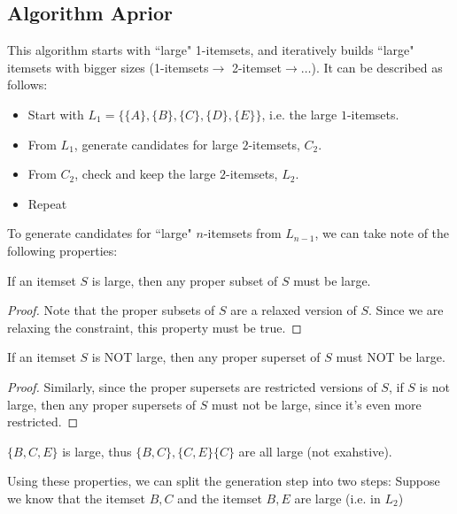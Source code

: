 \documentclass[../main/main.tex]{subfiles}
\begin{document}
	\subsection{Algorithm Aprior}
	This algorithm starts with ``large" 1-itemsets, and iteratively builds ``large" itemsets with bigger sizes (1-itemsets$\to$ 2-itemset$\to\ldots$). It can be described as follows:
	\begin{itemize}
		\item Start with $L_1=\{\{A\} ,\{B\} ,\{C\} ,\{D\} ,\{E\} \} $, i.e. the large $1$-itemsets.
		\item From $L_1$, generate candidates for large $2$-itemsets, $C_2$.
		\item From $C_2$, check and keep the large $2$-itemsets, $L_2$.
		\item Repeat
	\end{itemize}
	To generate candidates for ``large" $n$-itemsets from $L_{n-1}$, we can take note of the following properties:
	\begin{theorem}\label{largesubsets}
		If an itemset $S$ is large, then any proper subset of $S$ must be large.
	\end{theorem}
	\begin{proof}
		Note that the proper subsets of $S$ are a relaxed version of $S$. Since we are relaxing the constraint, this property must be true.
	\end{proof}
\begin{theorem}
	If an itemset $S$ is NOT large, then any proper superset of $S$ must NOT be large.
\end{theorem}
\begin{proof}
	Similarly, since the proper supersets are restricted versions of $S$, if $S$ is not large, then any proper supersets of $S$ must not be large, since it's even more restricted.
\end{proof}
\begin{example}
	$\{B,C,E\} $ is large, thus $\{B,C\} ,\{C,E\} \{C\} $ are all large (not exahstive).
\end{example}
	Using these properties, we can split the generation step into two steps: 
	Suppose we know that the itemset $B,C$ and the itemset $B,E$ are large (i.e. in $L_2$)
\end{document}
